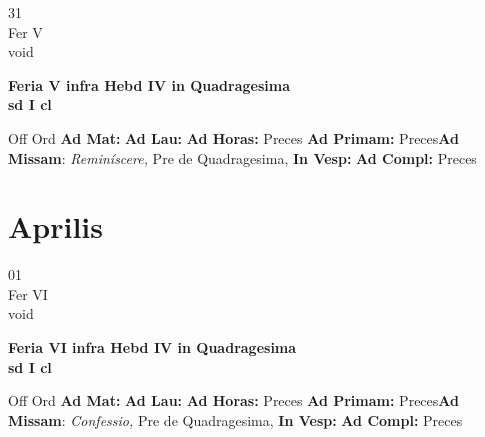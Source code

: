 \documentclass[10pt, openany]{book}
\begin{document}
    \begin{center}
        \begin{minipage}{3.5in}
            \vspace{2em}
            \begin{minipage}{0.5in}
                {\Huge 31} \\
                {\normalsize Fer V} \\
                {\normalsize void}
            \end{minipage}
            \begin{minipage}{3.0in}
                \textbf{ \large Feria V infra Hebd IV in Quadragesima  \\
                \textnormal{\normalsize sd I cl}} \\ 
            \end{minipage}
            \begin{justify}Off Ord
                \textbf{Ad Mat: }
                \textbf{Ad Lau: }
                \textbf{Ad Horas: }Preces
                \textbf{Ad Primam: }Preces\textbf{Ad Missam}: \textit{Reminíscere,} Pre de Quadragesima,  
                \textbf{In Vesp: }
                \textbf{Ad Compl: }Preces
            \end{justify}
        \end{minipage}
    \end{center}

    \chapter{Aprilis}
                    
    \begin{center}
        \begin{minipage}{3.5in}
            \vspace{2em}
            \begin{minipage}{0.5in}
                {\Huge 01} \\
                {\normalsize Fer VI} \\
                {\normalsize void}
            \end{minipage}
            \begin{minipage}{3.0in}
                \textbf{ \large Feria VI infra Hebd IV in Quadragesima  \\
                \textnormal{\normalsize sd I cl}} \\ 
            \end{minipage}
            \begin{justify}Off Ord
                \textbf{Ad Mat: }
                \textbf{Ad Lau: }
                \textbf{Ad Horas: }Preces
                \textbf{Ad Primam: }Preces\textbf{Ad Missam}: \textit{Confessio,} Pre de Quadragesima,  
                \textbf{In Vesp: }
                \textbf{Ad Compl: }Preces
            \end{justify}
        \end{minipage}
    \end{center}
\end{document}
